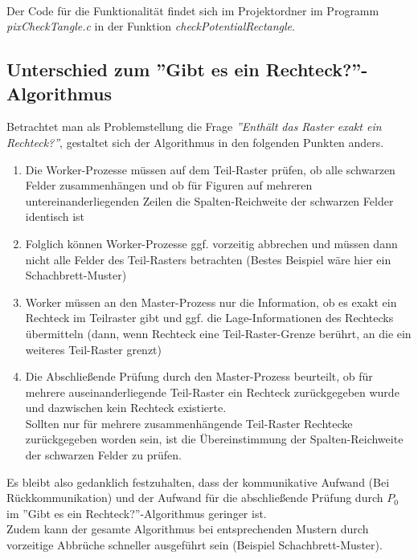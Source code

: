 \documentclass[
10pt, %
a4paper, %
oneside, %
headinclude,footinclude, %
BCOR5mm, %
]{scrartcl}
\begin{document}
\begin{algorithm}[H]
{{		}
	}
\end{algorithm}\

Der Code für die Funktionalität findet sich im Projektordner im Programm \textit{pixCheckTangle.c} in der Funktion \textit{checkPotentialRectangle}.

\subsection{Unterschied zum ''Gibt es ein Rechteck?''-Algorithmus}

Betrachtet man als Problemstellung die Frage \textit{''Enthält das Raster exakt ein Rechteck?''}, gestaltet sich der Algorithmus in den folgenden Punkten anders.

\begin{enumerate}[noitemsep]
	\item Die Worker-Prozesse müssen auf dem Teil-Raster prüfen, ob alle schwarzen Felder zusammenhängen und ob für Figuren auf mehreren untereinanderliegenden Zeilen die Spalten-Reichweite der schwarzen Felder identisch ist
	\item Folglich können Worker-Prozesse ggf. vorzeitig abbrechen und müssen dann nicht alle Felder des Teil-Rasters betrachten (Bestes Beispiel wäre hier ein Schachbrett-Muster)
	\item Worker müssen an den Master-Prozess nur die Information, ob es exakt ein Rechteck im Teilraster gibt und ggf. die Lage-Informationen des Rechtecks übermitteln (dann, wenn Rechteck eine Teil-Raster-Grenze berührt, an die ein weiteres Teil-Raster grenzt)
	\item Die Abschließende Prüfung durch den Master-Prozess beurteilt, ob für mehrere auseinanderliegende Teil-Raster ein Rechteck zurückgegeben wurde und dazwischen kein Rechteck existierte.\\ Sollten nur für mehrere zusammenhängende Teil-Raster Rechtecke zurückgegeben worden sein, ist die Übereinstimmung der Spalten-Reichweite der schwarzen Felder zu prüfen.
\end{enumerate}

Es bleibt also gedanklich festzuhalten, dass der kommunikative Aufwand (Bei Rückkommunikation) und der Aufwand für die abschließende Prüfung durch \(P_0\) im ''Gibt es ein Rechteck?''-Algorithmus geringer ist.\\
Zudem kann der gesamte Algorithmus bei entsprechenden Mustern durch vorzeitige Abbrüche schneller ausgeführt sein (Beispiel Schachbrett-Muster).
\end{document}
